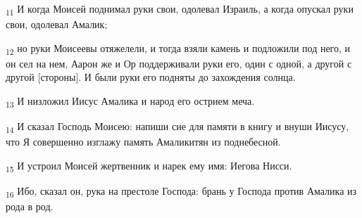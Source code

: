 \begin{tcolorbox}
\textsubscript{11} И когда Моисей поднимал руки свои, одолевал Израиль, а когда опускал руки свои, одолевал Амалик;
\end{tcolorbox}
\begin{tcolorbox}
\textsubscript{12} но руки Моисеевы отяжелели, и тогда взяли камень и подложили под него, и он сел на нем, Аарон же и Ор поддерживали руки его, один с одной, а другой с другой [стороны]. И были руки его подняты до захождения солнца.
\end{tcolorbox}
\begin{tcolorbox}
\textsubscript{13} И низложил Иисус Амалика и народ его острием меча.
\end{tcolorbox}
\begin{tcolorbox}
\textsubscript{14} И сказал Господь Моисею: напиши сие для памяти в книгу и внуши Иисусу, что Я совершенно изглажу память Амаликитян из поднебесной.
\end{tcolorbox}
\begin{tcolorbox}
\textsubscript{15} И устроил Моисей жертвенник и нарек ему имя: Иегова Нисси.
\end{tcolorbox}
\begin{tcolorbox}
\textsubscript{16} Ибо, сказал он, рука на престоле Господа: брань у Господа против Амалика из рода в род.
\end{tcolorbox}
